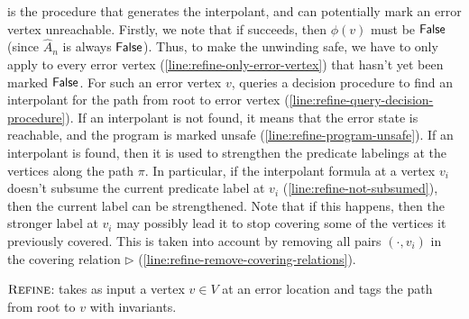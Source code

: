  is the procedure that generates the interpolant, and can potentially mark an error
vertex unreachable. Firstly, we note that if  succeeds, then $\phi(v)$ must be
$\mathsf{False}$ (since $\hat{A}_n$ is always $\mathsf{False}$). Thus, to make the unwinding safe, we have
to only apply  to every error vertex (\autoref{line:refine-only-error-vertex}) that
hasn't yet been marked $\mathsf{False}$. For such an error vertex $v$,  queries a decision
procedure \cite{mcmillan05} to find an interpolant for the path from root to error vertex
(\autoref{line:refine-query-decision-procedure}). If an interpolant is not found, it means
that the error state is reachable, and the program is marked unsafe
(\autoref{line:refine-program-unsafe}). If an interpolant is found, then it is used to
strengthen the predicate labelings at the vertices along the path $\pi$. In particular, if
the interpolant formula at a vertex $v_i$ doesn't subsume the current predicate label at
$v_i$ (\autoref{line:refine-not-subsumed}), then the current label can be strengthened.
Note that if this happens, then the stronger label at $v_i$ may possibly lead it to stop
covering some of the vertices it previously covered. This is taken into account by
removing all pairs $(\cdot, v_i)$ in the covering relation $\rhd$
(\autoref{line:refine-remove-covering-relations}).

\begin{algorithm}[ht]


  \caption{$\textsc{Refine}$: takes as input a vertex $v \in V$ at an error location and tags the path from root to $v$ with invariants.}
  \label{alg:refine}
\end{algorithm}

